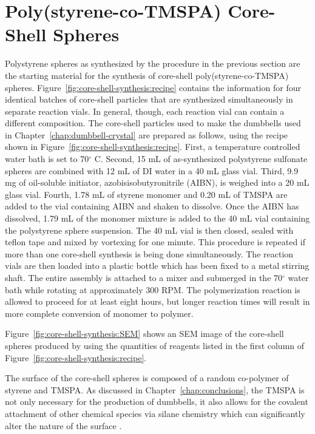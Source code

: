 \section{Poly(styrene-co-TMSPA) Core-Shell Spheres}
\label{chap:synthesis:cs}

Polystyrene spheres as synthesized by the procedure in the previous section are the starting material for the synthesis of core-shell poly(styrene-co-TMSPA) spheres.
Figure~\ref{fig:core-shell-synthesis:recipe} contains the information for four identical batches of core-shell particles that are synthesized simultaneously in separate reaction vials.
In general, though, each reaction vial can contain a different composition.
The core-shell particles used to make the dumbbells used in Chapter~\ref{chap:dumbbell-crystal} are prepared as follows, using the recipe shown in Figure~\ref{fig:core-shell-synthesis:recipe}.
First, a temperature controlled water bath is set to 70$^\circ$ C.
Second, 15 mL of as-synthesized polystyrene sulfonate spheres are combined with 12 mL of DI water in a 40 mL glass vial.
Third, 9.9 mg of oil-soluble initiator,  azobisisobutyronitrile (AIBN), is weighed into a 20 mL glass vial.
Fourth, 1.78 mL of styrene monomer and 0.20 mL of TMSPA are added to the vial containing AIBN and shaken to dissolve.
Once the AIBN has dissolved, 1.79 mL of the monomer mixture is added to the 40 mL vial containing the polystyrene sphere suspension.
The 40 mL vial is then closed, sealed with teflon tape and mixed by vortexing for one minute.
This procedure is repeated if more than one core-shell synthesis is being done simultaneously.
The reaction vials are then loaded into a plastic bottle which has been fixed to a metal stirring shaft.
The entire assembly is attached to a mixer and submerged in the 70$^\circ$ water bath while rotating at approximately 300 RPM.
The polymerization reaction is allowed to proceed for at least eight hours, but longer reaction times will result in more complete conversion of monomer to polymer.

Figure~\ref{fig:core-shell-synthesis:SEM} shows an SEM image of the core-shell spheres produced by using the quantities of reagents listed in the first column of Figure~\ref{fig:core-shell-synthesis:recipe}.

The surface of the core-shell spheres is composed of a random co-polymer of styrene and TMSPA.
As discussed in Chapter~\ref{chap:conclusions}, the TMSPA is not only necessary for the production of dumbbells, it also allows for the covalent attachment of other chemical species via silane chemistry which can significantly alter the nature of the surface \cite{DerVoort:1996}.

